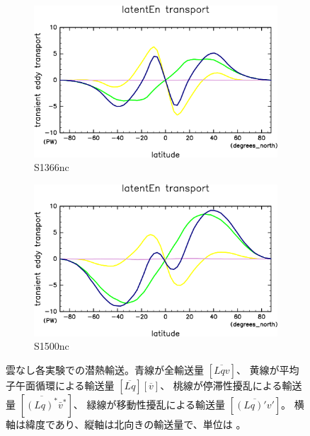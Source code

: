 \documentclass[body]{subfiles}
\begin{document}
\begin{figure}[t]
	\centering
	\begin{subfigure}{.4\textwidth}
		\centering
		\includegraphics[width=\columnwidth]{S1366-nc/MeriHeatTrans@latentEn,time=3650:4015-crop-rotate.pdf}
		\caption{S1366nc}\label{潜熱S1366nc}
	\end{subfigure}
	\begin{subfigure}{.4\textwidth}
		\centering
		\includegraphics[width=\columnwidth]{S1500-nc/MeriHeatTrans@latentEn,time=3650:4015-crop-rotate.pdf}
		\caption{S1500nc}\label{潜熱S1500nc}
	\end{subfigure}
	\caption[雲なし各実験での南北熱輸送量]{
		雲なし各実験での潜熱輸送。青線が全輸送量 \([\overline{Lqv}]\)、
		黄線が平均子午面循環による輸送量 \([\overline{Lq}][\overline{v}]\)、
		桃線が停滞性擾乱による輸送量 \([\overline{(Lq)^*}\bar v^*]\)、
		緑線が移動性擾乱による輸送量 \([\overline{(Lq)'v'}]\)。
		横軸は緯度であり、縦軸は北向きの輸送量で、単位は 。
	}\label{潜熱nc}
\end{figure}
\end{document}
